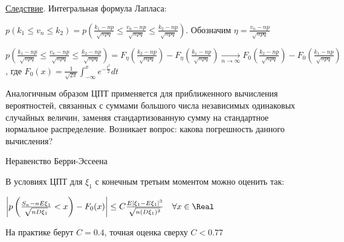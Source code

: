 \underline{Следствие}. Интегральная формула Лапласа:

$p(k_1 \leq v_n \leq k_2) = p\left(\frac{k_1 - np}{\sqrt{npq}} \leq \frac{v_n - np}{\sqrt{npq}} \leq \frac{k_2 - np}{\sqrt{npq}}\right)$. Обозначим $\eta = \frac{v_n - np}{\sqrt{npq}}$

$p\left(\frac{k_1 - np}{\sqrt{npq}} \leq \frac{v_n - np}{\sqrt{npq}} \leq \frac{k_2 - np}{\sqrt{npq}}\right) = F_\eta\left(\frac{k_2 - np}{\sqrt{npq}}\right) - F_\eta\left(\frac{k_1 - np}{\sqrt{npq}}\right) \underset{n \to \infty}{\longrightarrow} F_0\left(\frac{k_2 - np}{\sqrt{npq}}\right) - F_0\left(\frac{k_1 - np}{\sqrt{npq}}\right)$,
где $F_0(x) = \frac{1}{\sqrt{2\pi}} \int_{-\infty}^x e^{-\frac{t^2}{2}} dt$

\Nota Аналогичным образом ЦПТ применяется для приближенного вычисления вероятностей, связанных с суммами большого числа независимых одинаковых случайных величин, заменяя стандартизованную сумму на стандартное нормальное распределение.
Возникает вопрос: какова погрешность данного вычисления?

\hypertarget{berryesseentheorem}{}

\begin{MyTheorem}
    \Ths Неравенство Берри-Эссеена

    В условиях ЦПТ для $\xi_1$ с конечным третьим моментом можно оценить так:

    $\left|p\left(\frac{S_n - nE\xi_1}{\sqrt{nD\xi_1}} < x\right) - F_0(x)\right| \leq C\frac{E|\xi_1 - E\xi_1|^3}{\sqrt{n(D\xi_1)^3}} \quad \forall x \in \Real$
\end{MyTheorem}

\Nota На практике берут $C = 0.4$, точная оценка сверху $C < 0.77$
